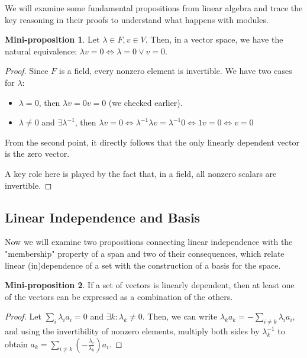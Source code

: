 \documentclass{article}
\newif\ifusemulticols
\theoremstyle{definition}
\newtheorem{miniprop}{Mini-proposition}[section]
\theoremstyle{remark}
\theoremstyle{plain}
\theoremstyle{plain}
\newenvironment{mymulticols}
    { \ifusemulticols \begin{multicols}{2} \fi }
    { \ifusemulticols \end{multicols} \fi }
\begin{document}
\begin{mymulticols}
We will examine some fundamental propositions from linear algebra and trace the key reasoning in
their proofs to understand what happens with modules.

\begin{miniprop}
    Let $\lambda \in F, v \in V$. Then, in a vector space, we have the natural equivalence:
    $\lambda v = 0 \Leftrightarrow \lambda = 0 \lor v = 0$.
\end{miniprop}

\begin{proof}
    Since $F$ is a field, every nonzero element is invertible. We have two cases for $\lambda$:
    \begin{itemize}
        \item $\lambda = 0$, then $\lambda v = 0v = 0$ (we checked earlier).
        \item $\lambda \neq 0$ and $\exists \lambda^{-1}$, then $\lambda v = 0
            \Leftrightarrow \lambda^{-1}\lambda v = \lambda^{-1}0 \Leftrightarrow
            1v=0 \Leftrightarrow v=0$
    \end{itemize}
    From the second point, it directly follows that the only linearly dependent vector is the zero
    vector.

    A key role here is played by the fact that, in a field, all nonzero scalars are invertible.
\end{proof}

\subsection*{Linear Independence and Basis}
Now we will examine two propositions connecting linear independence with the "membership" property
of a span and two of their consequences, which relate linear (in)dependence of a set with the
construction of a basis for the space.

\begin{miniprop}
    \label{prop:dep_impl_lies_in_span}
    If a set of vectors is linearly dependent, then at least one of the vectors can be expressed as
    a combination of the others.
\end{miniprop}
\begin{proof}
    Let $\sum_i \lambda_i a_i = 0$ and $\exists k: \lambda_k \neq 0$. 
    Then, we can write $\lambda_k a_k = -\sum_{i\neq k} \lambda_i a_i$, and using the invertibility
    of nonzero elements, multiply both sides by $\lambda_k^{-1}$ to obtain $a_k = \sum_{i \neq k}
    \left(-\frac{\lambda_i}{\lambda_k}\right) a_i$.
\end{proof}


\end{mymulticols}
\end{document}
